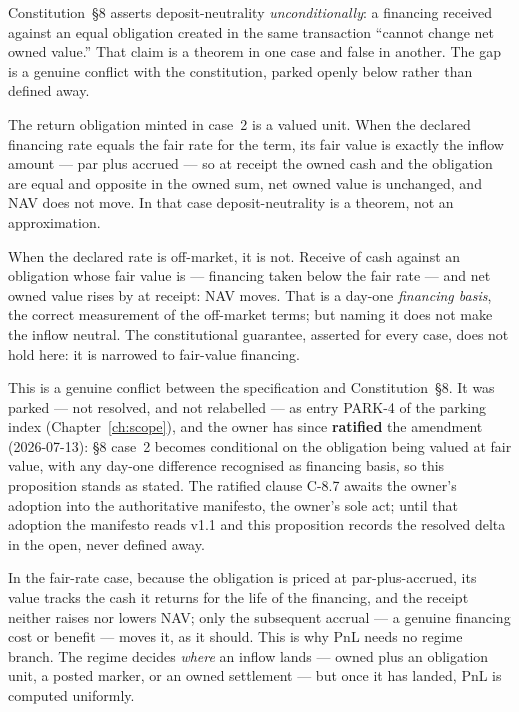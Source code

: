 \begin{proposition}
Constitution~\S8 asserts deposit-neutrality \emph{unconditionally}: a financing
received against an equal obligation created in the same transaction ``cannot
change net owned value.'' That claim is a theorem in one case and false in
another. The gap is a genuine conflict with the constitution, parked openly below
rather than defined away.

The return obligation minted in case~2 is a valued unit. When the declared
financing rate equals the fair rate for the term, its fair value is exactly the
inflow amount --- par plus accrued --- so at receipt the owned cash and the
obligation are equal and opposite in the owned sum, net owned value is unchanged,
and NAV does not move. In that case deposit-neutrality is a theorem, not an
approximation.

When the declared rate is off-market, it is not. Receive  of cash
against an obligation whose fair value is  --- financing taken below the
fair rate --- and net owned value rises by  at receipt: NAV moves. That
 is a day-one \emph{financing basis}, the correct measurement of the
off-market terms; but naming it does not make the inflow neutral. The
constitutional guarantee, asserted for every case, does not hold here: it is
narrowed to fair-value financing.

This is a genuine conflict between the specification and Constitution~\S8. It was
parked --- not resolved, and not relabelled --- as entry PARK-4 of the parking
index (Chapter~\ref{ch:scope}), and the owner has since \textbf{ratified} the
amendment (2026-07-13): \S8 case~2 becomes conditional on the obligation being
valued at fair value, with any day-one difference recognised as financing basis, so
this proposition stands as stated. The ratified clause C-8.7 awaits the owner's
adoption into the authoritative manifesto, the owner's sole act; until that adoption
the manifesto reads v1.1 and this proposition records the resolved delta in the open,
never defined away.
\end{proposition}

In the fair-rate case, because the obligation is priced at par-plus-accrued, its
value tracks the cash it returns for the life of the financing, and the receipt
neither raises nor lowers NAV; only the subsequent accrual --- a genuine
financing cost or
benefit --- moves it, as it should. This is why PnL needs no regime branch. The
regime decides \emph{where} an inflow lands --- owned plus an obligation unit,
a posted marker, or an owned settlement --- but once it has landed, PnL is
computed uniformly.

